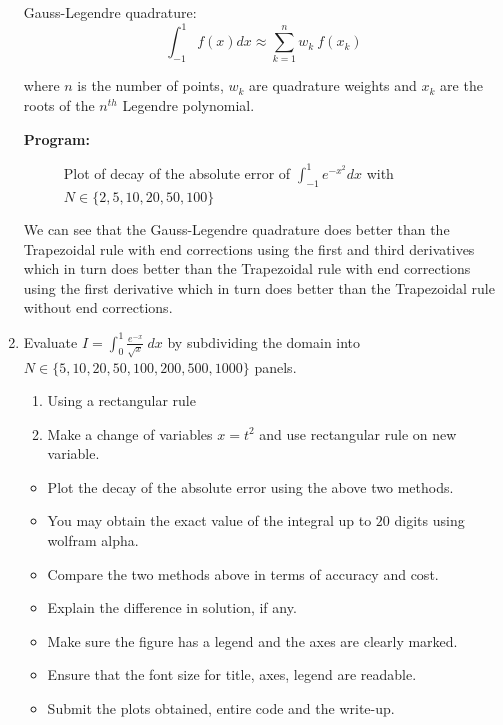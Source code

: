 \documentclass[a4paper,11pt]{report}
\begin{document}
\begin{enumerate}
    Gauss-Legendre quadrature:
    \begin{equation*}
    \int_{-1}^{1} f(x) dx \approx \sum_{k=1}^{n} w_{k}\ f(x_{k})
    \end{equation*}

    where $n$ is the number of points, $w_{k}$ are quadrature weights and 
    $x_{k}$ are the roots of the $n^{th}$ Legendre polynomial. 
            
    \pagebreak

    \textbf{Program:}
    

    \begin{figure}[ht!]
    \centering
    \resizebox{0.95\linewidth}{!}{}
    \caption{Plot of decay of the absolute error of $\displaystyle 
    \int_{-1}^{1} e^{-x^2} dx$ with $N \in \{2, 5, 10, 20, 50, 100\}$}
    \end{figure}
    
    \vspace{-0.5cm}
    

    We can see that the Gauss-Legendre quadrature does better than the 
    Trapezoidal rule with end corrections using the first and third derivatives
    which in turn does better than the Trapezoidal rule with end corrections
    using the first derivative which in turn does better than the Trapezoidal 
    rule without end corrections.

    \vspace{1cm}

    \item Evaluate $I = \displaystyle \int_{0}^{1} \frac{e^{-x}}{\sqrt{x}}\ dx$
    by subdividing the domain into $N \in \{5, 10, 20, 50, 100, 200, 500, 
    1000\}$ panels.

    \begin{enumerate}
    \item Using a rectangular rule
    \item Make a change of variables $x = t^{2}$ and use rectangular rule on 
    new variable.
    \end{enumerate}

    \begin{itemize}
    \item Plot the decay of the absolute error using the above two methods.
    \item You may obtain the exact value of the integral up to $20$ digits 
    using wolfram alpha.
    \item Compare the two methods above in terms of accuracy and cost.
    \item Explain the difference in solution, if any.
    \item Make sure the figure has a legend and the axes are clearly marked.
    \item Ensure that the font size for title, axes, legend are readable.
    \item Submit the plots obtained, entire code and the write-up.
    \end{itemize}
    

\end{enumerate}
\end{document}
